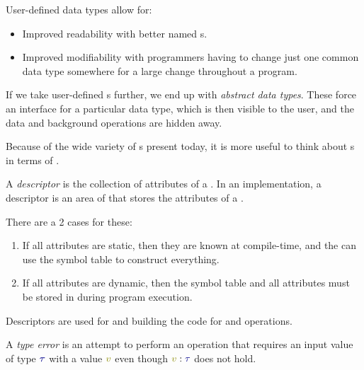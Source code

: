 User-defined data types allow for:
\begin{itemize}[noitemsep]
\item Improved readability with better named s.
\item Improved modifiability with programmers having to change just one common data type somewhere for a large change throughout a program.
\end{itemize}

If we take user-defined s further, we end up with \emph{abstract data types}.
These force an interface for a particular data type, which is then visible to the user, and the data and background operations are hidden away.

Because of the wide variety of s present today, it is more useful to think about s in terms of .

\begin{definition}[Descriptor]\label{def:Descriptor}
  A \emph{descriptor} is the collection of attributes of a .
  In an implementation, a descriptor is an area of  that stores the attributes of a .

  There are a 2 cases for these:
  \begin{enumerate}[noitemsep]
  \item If all attributes are static, then they are known at compile-time, and the  can use the symbol table to construct everything.
  \item If all attributes are dynamic, then the symbol table and all attributes must be stored in  during program execution.
  \end{enumerate}

  Descriptors are used for  and building the code for  and  operations.
\end{definition}

\begin{definition}\label{def:Type_Error}
  A \emph{type error} is an attempt to perform an operation that requires an input value of type $\DataType$ with a value $\SemanticValue{v}$ even though $\SemanticValue{v} : \DataType$ does not hold.
\end{definition}


